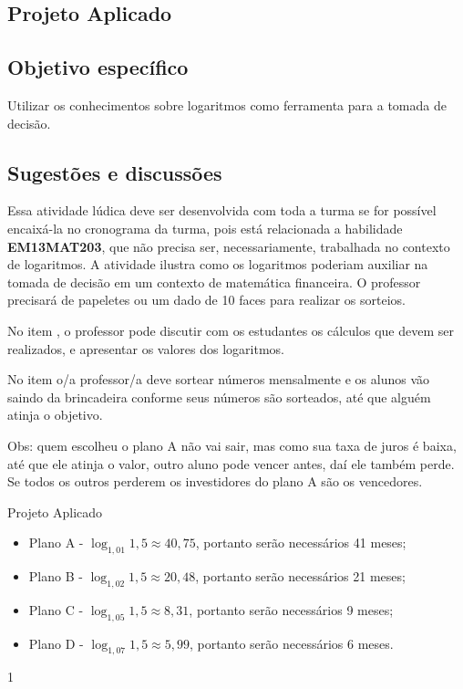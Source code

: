 \clearpage
\def\currentcolor{cor2}
\begin{texto}
{
\section{Projeto Aplicado}
\subsection{Objetivo específico}
Utilizar os conhecimentos sobre logaritmos como ferramenta para a tomada de decisão.

\subsection{Sugestões e discussões}
Essa atividade lúdica deve ser desenvolvida com toda a turma se for possível encaixá-la no cronograma da turma, pois está relacionada a habilidade \textbf{EM13MAT203}, que não precisa ser, necessariamente, trabalhada no contexto de logaritmos. A atividade ilustra como os logaritmos poderiam auxiliar na tomada de decisão em um contexto de matemática financeira. O professor precisará de papeletes ou um dado de 10 faces para realizar os sorteios.

No item , o professor pode discutir com os estudantes os cálculos que devem ser realizados, e apresentar os valores dos logaritmos.

No item  o/a professor/a deve sortear números mensalmente e os alunos vão saindo da brincadeira conforme seus números são sorteados, até que alguém atinja o objetivo.

Obs: quem escolheu o plano A não vai  sair, mas como sua taxa de juros é baixa, até que ele atinja o valor, outro aluno pode vencer antes, daí ele também perde. Se todos os outros perderem os investidores do plano A são os vencedores. }
\end{texto}
\begin{answer}{Projeto Aplicado}
{
	\begin{itemize}
	\item Plano A - $\log_{1,01} 1,5 \approx 40,75$, portanto serão necessários 41 meses; 
	\item Plano B - $\log_{1,02} 1,5 \approx 20,48$, portanto serão necessários 21 meses;
	\item Plano C - $\log_{1,05} 1,5 \approx 8,31$, portanto serão necessários 9 meses;
	\item Plano D - $\log_{1,07} 1,5 \approx 5,99$, portanto serão necessários 6 meses.
	\end{itemize}
}{1}
\end{answer}

